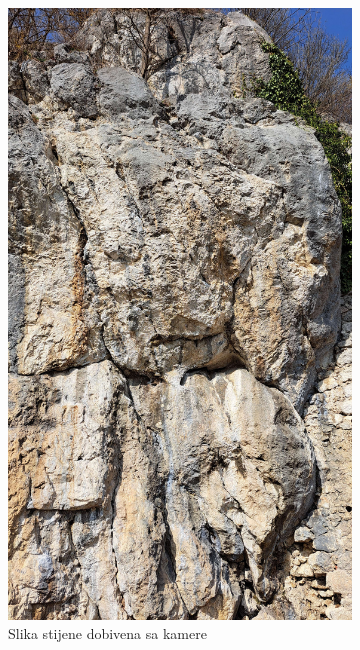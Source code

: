 \begin{figure}[H]
    \centering
    \begin{subfigure}[b]{0.32\textwidth}
        \centering
        \includegraphics[width=\textwidth]{images/racunalniVid/apaches_frame.jpg}
        \caption{Slika stijene dobivena sa kamere}
        \label{fig:referentna_slika_stijene}
    \end{subfigure}
    \hfill
    \begin{subfigure}[b]{0.32\textwidth}

\end{subfigure}
\end{figure}
